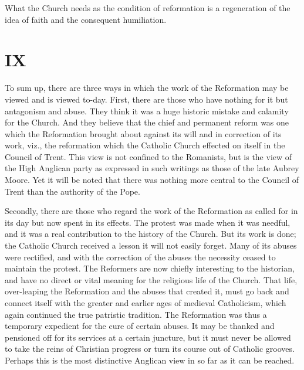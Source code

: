 \documentclass[12pt,a5paper,twoside]{book}
\begin{document}
What the Church needs as the condition of reformation 
is a regeneration of the idea of faith and 
the consequent humiliation. 

\section*{IX}
 
To sum up, there are three ways in which the 
work of the Reformation may be viewed and is viewed 
to-day. First, there are those who have nothing for 
it but antagonism and abuse. They think it was a 
huge historic mistake and calamity for the Church. 
And they believe that the chief and permanent reform 
was one which the Reformation brought about against 
its will and in correction of its work, viz., the reformation 
which the Catholic Church effected on itself 
in the Council of Trent. This view is not confined 
to the Romanists, but is the view of the High Anglican 
party as expressed in such writings as those of the 
late Aubrey Moore. Yet it will be noted that there 
was nothing more central to the Council of Trent 
than the authority of the Pope. 

Secondly, there are those who regard the work of 
the Reformation as called for in its day but now spent 
in its effects. The protest was made when it was 
needful, and it was a real contribution to the history of 
the Church. But its work is done; the Catholic 
Church received a lesson it will not easily forget. 
Many of its abuses were rectified, and with the correction 
of the abuses the necessity ceased to maintain the 
protest. The Reformers are now chiefly interesting 
to the historian, and have no direct or vital meaning 
for the religious life of the Church. That life, over-leaping the Reformation and the abuses that created 
it, must go back and connect itself with the greater 
and earlier ages of medieval Catholicism, which again 
continued the true patristic tradition. The Reformation 
was thus a temporary expedient for the cure of 
certain abuses. It may be thanked and pensioned off 
for its services at a certain juncture, but it must never 
be allowed to take the reins of Christian progress or 
turn its course out of Catholic grooves. Perhaps this 
is the most distinctive Anglican view in so far as it 
can be reached. 
\end{document}
